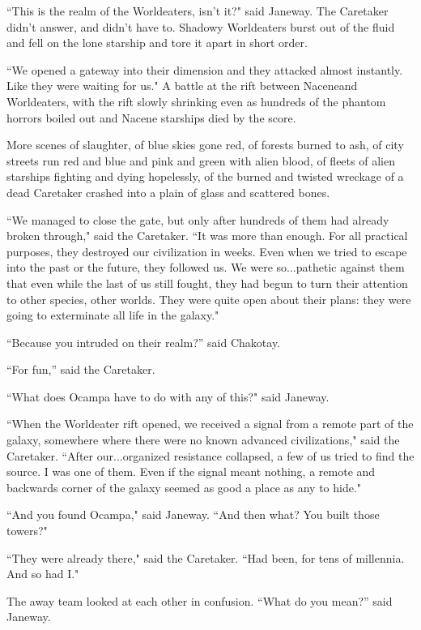 \documentclass[twoside,letterpaper,12pt]{memoir}
\begin{document}
``This is the realm of the Worldeaters, isn't it?" said Janeway. The Caretaker didn't answer, and didn't have to. Shadowy Worldeaters burst out of the fluid and fell on the lone starship and tore it apart in short order. 

``We opened a gateway into their dimension and they attacked almost instantly. Like they were waiting for us." A battle at the rift between Naceneand Worldeaters, with the rift slowly shrinking even as hundreds of the phantom horrors boiled out and Nacene starships died by the score. 

More scenes of slaughter, of blue skies gone red, of forests burned to ash, of city streets run red and blue and pink and green with alien blood, of fleets of alien starships fighting and dying hopelessly, of the burned and twisted wreckage of a dead Caretaker crashed into a plain of glass and scattered bones. 

``We managed to close the gate, but only after hundreds of them had already broken through," said the Caretaker. ``It was more than enough. For all practical purposes, they destroyed our civilization in weeks. Even when we tried to escape into the past or the future, they followed us. We were so...pathetic against them that even while the last of us still fought, they had begun to turn their attention to other species, other worlds. They were quite open about their plans: they were going to exterminate all life in the galaxy." 

``Because you intruded on their realm?” said Chakotay. 

``For fun,” said the Caretaker. 

``What does Ocampa have to do with any of this?" said Janeway. 

``When the Worldeater rift opened, we received a signal from a remote part of the galaxy, somewhere where there were no known advanced civilizations," said the Caretaker. ``After our...organized resistance collapsed, a few of us tried to find the source. I was one of them. Even if the signal meant nothing, a remote and backwards corner of the galaxy seemed as good a place as any to hide." 

``And you found Ocampa," said Janeway. ``And then what? You built those towers?" 

``They were already there," said the Caretaker. ``Had been, for tens of millennia. And so had I." 

The away team looked at each other in confusion. ``What do you mean?” said Janeway. 
\end{document}
